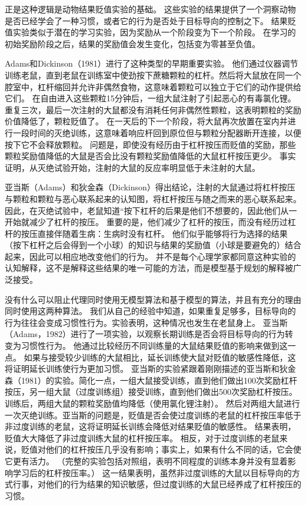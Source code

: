 {{{{{{{{{{{{{正是这种逻辑是动物结果贬值实验的基础。
这些实验的结果提供了一个洞察动物是否已经学会了一种习惯，或者它的行为是否处于目标导向的控制之下。
结果贬值实验类似于潜在的学习实验，因为奖励从一个阶段变为下一个阶段。
在学习的初始奖励阶段之后，结果的奖励值会发生变化，包括变为零甚至负值。


Adams和Dickinson（1981）进行了这种类型的早期重要实验。
他们通过仪器调节训练老鼠，直到老鼠在训练室中使劲按下蔗糖颗粒的杠杆。然后将大鼠放在同一个腔室中，杠杆缩回并允许非偶然食物，这意味着颗粒可以独立于它们的动作提供给它们。
在自由进入这些颗粒15分钟后，一组大鼠注射了引起恶心的有毒氯化锂。
重复三次，最后一次注射的大鼠都没有消耗任何非偶然性颗粒，这表明颗粒的奖励价值降低了，颗粒贬值了。
在一天后的下一个阶段，将大鼠再次放置在室内并进行一段时间的灭绝训练，这意味着响应杆回到原位但与颗粒分配器断开连接，以便按下它不会释放颗粒。
问题是，即使没有经历由于杠杆按压而贬值的奖励，那些颗粒奖励值降低的大鼠是否会比没有颗粒奖励值降低的大鼠杠杆按压更少。
事实证明，从灭绝试验开始，注射的大鼠的反应率明显低于未注射的大鼠。


亚当斯（Adams）和狄金森（Dickinson）得出结论，注射的大鼠通过将杠杆按压与颗粒和颗粒与恶心联系起来的认知图，将杠杆按压与随之而来的恶心联系起来。
因此，在灭绝试验中，老鼠知道“按下杠杆的后果是他们不想要的，因此他们从一开始就减少了杠杆的按压。
重要的是，他们减少了杠杆的按压，而没有经历过杠杆的按压直接伴随着生病：生病时没有杠杆。
他们似乎能够将行为选择的结果（按下杠杆之后会得到一个小球）的知识与结果的奖励值（小球是要避免的）结合起来，因此可以相应地改变他们的行为。
并不是每个心理学家都同意这种实验的认知解释，这不是解释这些结果的唯一可能的方法，而是模型基于规划的解释被广泛接受。


没有什么可以阻止代理同时使用无模型算法和基于模型的算法，并且有充分的理由同时使用这两种算法。
我们从自己的经验中知道，如果重复足够多，目标导向的行为往往会变成习惯性行为。实验表明，这种情况也发生在老鼠身上。
亚当斯（Adams，1982）进行了一项实验，以观察长期训练是否会将目标导向的行为转变为习惯性行为。
他通过比较经历不同训练量的大鼠结果贬值的影响来做到这一点。
如果与接受较少训练的大鼠相比，延长训练使大鼠对贬值的敏感性降低，这将证明延长训练使行为更加习惯。
亚当斯的实验紧跟着刚刚描述的亚当斯和狄金森（1981）的实验。简化一点，一组大鼠接受训练，直到他们做出100次奖励杠杆按压，另一组大鼠（过度训练组）接受训练，直到他们做出500次奖励杠杆按压。
训练后，两组大鼠的颗粒奖励值均降低（使用氯化锂注射）。
然后对两组大鼠进行一次灭绝训练。亚当斯的问题是，贬值是否会使过度训练的老鼠的杠杆按压率低于非过度训练的老鼠，这将证明延长训练会降低对结果贬值的敏感性。
结果表明，贬值大大降低了非过度训练大鼠的杠杆按压率。
相反，对于过度训练的老鼠来说，贬值对他们的杠杆按压几乎没有影响；事实上，如果有什么不同的话，它会使它更有活力。
（完整的实验包括对照组，表明不同程度的训练本身并没有显着影响学习后的杠杆按压率。）
这一结果表明，虽然非过度训练的大鼠以目标导向的方式行事，对他们的行为结果的知识敏感，但过度训练的大鼠已经养成了杠杆按压的习惯。



}}}}}}}}}}}}}

